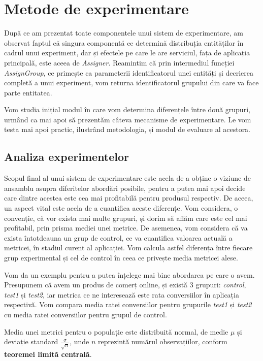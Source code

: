 \chapter{Metode de experimentare}

După ce am prezentat toate componentele unui sistem de experimentare, am observat faptul că singura componentă ce determină distribuția entităților în cadrul unui experiment, dar și efectele pe care le are serviciul, fața de aplicația principală, este aceea de \textit{Assigner}. Reamintim că prin intermediul funcției \textit{AssignGroup}, ce primește ca parameterii identificatorul unei entități și decrierea completă a unui experiment, vom returna identificatorul grupului din care va face parte entitatea. 

Vom studia inițial modul în care vom determina diferențele între două grupuri, urmând ca mai apoi să prezentăm câteva mecanisme de experimentare. Le vom testa mai apoi practic, ilustrând metodologia, și modul de evaluare al acestora.

\section{Analiza experimentelor}

Scopul final al unui sistem de experimentare este acela de a obține o viziune de ansamblu asupra diferitelor abordări posibile, pentru a putea mai apoi decide care dintre acestea este cea mai profitabilă pentru produsul respectiv. De aceea, un aspect vital este acela de a cuantifica aceste diferențe. Vom considera, o convenție, că vor exista mai multe grupuri, și dorim să aflăm care este cel mai profitabil, prin prisma mediei unei metrice. De asemenea, vom considera că va exista întotdeauna un grup de control, ce va cuantifica valoarea actuală a metricei, în stadiul curent al aplicației. Vom calcula astfel diferența între fiecare grup experimental și cel de control în ceea ce privește media metricei alese.

Vom da un exemplu pentru a putea înțelege mai bine abordarea pe care o avem. Presupunem că avem un produs de comerț online, și există 3 grupuri: \textit{control}, \textit{test1} și \textit{test2}, iar metrica ce ne interesează este rata conversiilor în aplicația respectivă. Vom compara media ratei conversiilor pentru grupurile \textit{test1} și \textit{test2} cu media ratei conversiilor pentru grupul de control.

\begin{theorem}
	Media unei metrici pentru o populație este distribuită normal, de medie ${\mu}$ și deviație standard $\frac{\sigma}{\sqrt{n}}$, unde $n$ reprezintă numărul observațiilor, conform \textbf{teoremei limită centrală}.
\end{theorem}

